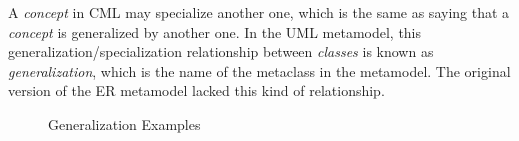 \begin{definition}
A \emph{concept} in CML may specialize another one,
which is the same as saying that a \emph{concept} is generalized by another one.
In the UML \cite{uml} metamodel,
this generalization/specialization relationship between \emph{classes}
is known as \emph{generalization}, which is the name of the metaclass in the metamodel.
The original version of the ER \cite{er} metamodel lacked this kind of relationship.
\end{definition}

\begin{figure}
\verbatimfont{\small}

\caption{Generalization Examples}
\label{fig:ex:concepts}
\end{figure}

